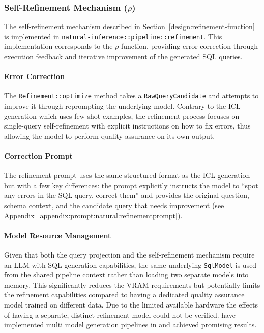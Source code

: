 \subsubsection{Self-Refinement Mechanism ($\rho$)}

The self-refinement mechanism described in
Section~\ref{design:refinement-function} is implemented in
\texttt{natural-inference::pipeline\allowbreak::refinement}. This implementation
corresponds to the $\rho$ function, providing error correction through
execution feedback and iterative improvement of the generated SQL queries.

\paragraph{Error Correction}

The \texttt{Refinement::optimize} method takes a \texttt{RawQueryCandidate} and
attempts to improve it through reprompting the underlying model. Contrary to
the ICL generation which uses few-shot examples, the refinement process focuses
on single-query self-refinement with explicit instructions on how to fix
errors, thus allowing the model to perform quality assurance on its own output.

\paragraph{Correction Prompt}

The refinement prompt uses the same structured format as the ICL generation but
with a few key differences: the prompt explicitly instructs the model to
``spot any errors in the SQL query, correct them'' and provides the original
question, schema context, and the candidate query that needs improvement
(see Appendix~\ref{appendix:prompt:natural:refinementprompt}).

\paragraph{Model Resource Management}

Given that both the query projection and the self-refinement mechanism require
an LLM with SQL generation capabilities, the same underlying \texttt{SqlModel}
is used from the shared pipeline context rather than loading two separate
models into memory. This significantly reduces the VRAM requirements but
potentially limits the refinement capabilities compared to having a dedicated
quality assurance model trained on different data. Due to the limited
available hardware the effects of having a separate, distinct refinement model
could not be verified. \citeauthor{XiYan} have implemented multi model
generation pipelines in \citeyear{XiYan} and achieved promising results.

